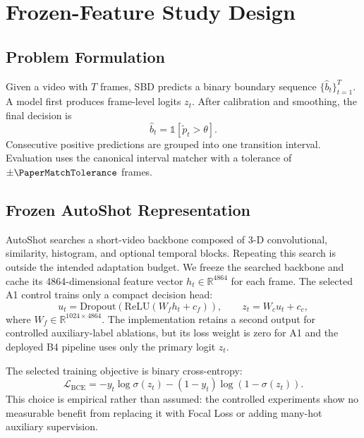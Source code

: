 \section{Frozen-Feature Study Design}

\subsection{Problem Formulation}

Given a video with $T$ frames, SBD predicts a binary boundary sequence
$\{\hat b_t\}_{t=1}^{T}$. A model first produces frame-level logits $z_t$.
After calibration and smoothing, the final decision is
\begin{equation}
    \hat b_t = \mathbb{1}[\tilde p_t > \theta].
\end{equation}
Consecutive positive predictions are grouped into one transition interval.
Evaluation uses the canonical interval matcher with a tolerance of
$\pm\PaperMatchTolerance$ frames.

\subsection{Frozen AutoShot Representation}

AutoShot \cite{zhu2023autoshot} searches a short-video backbone composed of
3-D convolutional, similarity, histogram, and optional temporal blocks.
Repeating this search is outside the intended adaptation budget. We freeze the
searched backbone and cache its 4864-dimensional feature vector
$h_t\in\mathbb{R}^{4864}$ for each frame. The selected A1 control trains only
a compact decision head:
\begin{equation}
    u_t = \mathrm{Dropout}(\mathrm{ReLU}(W_f h_t+c_f)),\qquad
    z_t = W_c u_t+c_c,
\end{equation}
where $W_f\in\mathbb{R}^{1024\times4864}$. The implementation retains a second
output for controlled auxiliary-label ablations, but its loss weight is zero
for A1 and the deployed B4 pipeline uses only the primary logit $z_t$.

The selected training objective is binary cross-entropy:
\begin{equation}
    \mathcal{L}_{\mathrm{BCE}}
    = -y_t\log\sigma(z_t)-(1-y_t)\log(1-\sigma(z_t)).
\end{equation}
This choice is empirical rather than assumed: the controlled experiments show
no measurable benefit from replacing it with Focal Loss or adding many-hot
auxiliary supervision.


